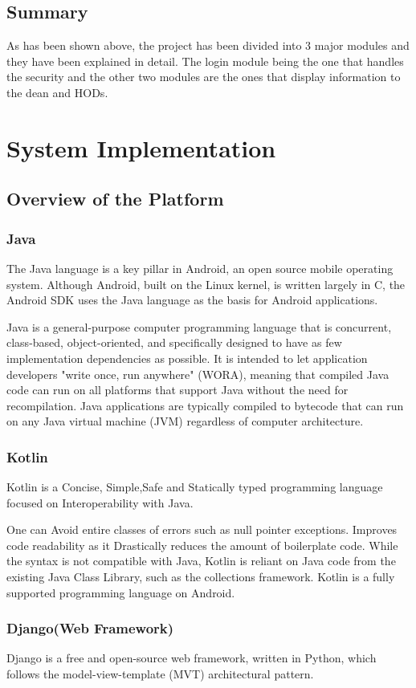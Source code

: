 \documentclass[BTech]{srmuthesis}
\begin{document}
\section{Summary}
As has been shown above, the project has been divided into 3 major modules and they have been explained in detail. The login module being the one that handles the security and the other two modules are the ones that display information to the dean and HODs.
\chapter{System Implementation}
\section{Overview of the Platform}
\subsection{Java}
The Java language is a key pillar in Android, an open source mobile operating system. Although Android, built on the Linux kernel, is written largely in C, the Android SDK uses the Java language as the basis for Android applications.

Java is a general-purpose computer programming language that is concurrent, class-based, object-oriented, and specifically designed to have as few implementation dependencies as possible. It is intended to let application developers "write once, run anywhere" (WORA), meaning that compiled Java code can run on all platforms that support Java without the need for recompilation. Java applications are typically compiled to bytecode that can run on any Java virtual machine (JVM) regardless of computer architecture. 
\subsection{Kotlin}
Kotlin is a Concise, Simple,Safe and Statically typed programming language focused on Interoperability with Java. 

One can Avoid entire classes of errors such as null pointer exceptions. Improves code readability as it Drastically reduces the amount of boilerplate code. While the syntax is not compatible with Java, Kotlin is reliant on Java code from the existing Java Class Library, such as the collections framework. 
Kotlin is a fully supported programming language on Android.
\subsection{Django(Web Framework)}
Django is a free and open-source web framework, written in Python, which follows the model-view-template (MVT) architectural pattern.
\end{document}
